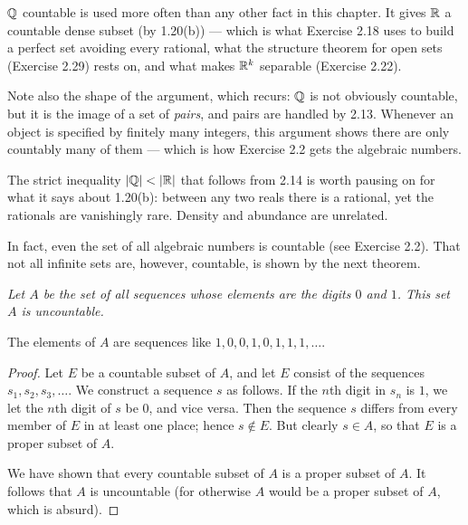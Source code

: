 \begin{deeper}
$\mathbb{Q}$ countable is used more often than any other fact in this chapter. It gives
$\mathbb{R}$ a countable dense subset (by 1.20(b)) --- which is what Exercise 2.18 uses
to build a perfect set avoiding every rational, what the structure theorem for
open sets (Exercise 2.29) rests on, and what makes $\mathbb{R}^k$ separable (Exercise
2.22).

Note also the shape of the argument, which recurs: $\mathbb{Q}$ is not obviously
countable, but it is the image of a set of \emph{pairs}, and pairs are handled
by 2.13. Whenever an object is specified by finitely many integers, this
argument shows there are only countably many of them --- which is how Exercise
2.2 gets the algebraic numbers.

The strict inequality $|\mathbb{Q}| < |\mathbb{R}|$ that follows from 2.14 is worth pausing on
for what it says about 1.20(b): between any two reals there is a rational, yet
the rationals are vanishingly rare. Density and abundance are unrelated.
\end{deeper}

In fact, even the set of all algebraic numbers is countable (see Exercise 2.2).
That not all infinite sets are, however, countable, is shown by the next
theorem.

\emph{Let $A$ be the set of all sequences whose elements are the digits $0$ and
$1$. This set $A$ is uncountable.}

The elements of $A$ are sequences like $1,0,0,1,0,1,1,1,\dots$.

\begin{proof}
Let $E$ be a countable subset of $A$, and let $E$ consist of the sequences
$s_1, s_2, s_3, \dots$. We construct a sequence $s$ as follows. If the $n$th
digit in $s_n$ is $1$, we let the $n$th digit of $s$ be $0$, and vice versa.
Then the sequence $s$ differs from every member of $E$ in at least one place;
hence $s \notin E$. But clearly $s \in A$, so that $E$ is a proper subset of
$A$.

We have shown that every countable subset of $A$ is a proper subset of $A$. It
follows that $A$ is uncountable (for otherwise $A$ would be a proper subset of
$A$, which is absurd).
\end{proof}

